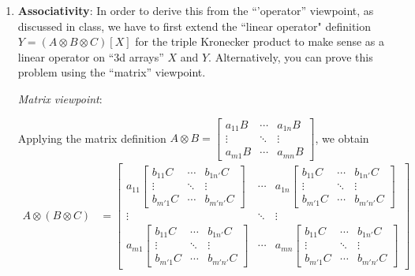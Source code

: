 \documentclass[10pt,oneside]{article}
\begin{document}
\begin{enumerate}

\item \textbf{Associativity}:  In order to derive this from the ``'operator'' viewpoint, as discussed in class, we have to first extend the ``linear operator" definition $Y = (A \otimes B \otimes C)[X]$ for the triple Kronecker product to make sense
as a linear operator on ``3d arrays'' $X$ and $Y$.   Alternatively, you can prove this problem using the ``matrix'' viewpoint.

\textit{Matrix viewpoint}:

Applying the matrix definition $A\otimes B = \begin{bmatrix}
  a_{11} B & \cdots & a_{1n}B \\
             \vdots & \ddots &           \vdots \\
  a_{m1} B & \cdots & a_{mn} B
\end{bmatrix}$, we obtain
\begin{align*}
A \otimes (B \otimes C) &= 
\begin{bmatrix}
  a_{11} \begin{bmatrix}
  b_{11} C & \cdots & b_{1n'}C \\
             \vdots & \ddots &           \vdots \\
  b_{m'1} C & \cdots & b_{m'n'} C
\end{bmatrix} & \cdots & a_{1n}\begin{bmatrix}
  b_{11} C & \cdots & b_{1n'}C \\
             \vdots & \ddots &           \vdots \\
  b_{m'1} C & \cdots & b_{m'n'} C
\end{bmatrix} \\
             \vdots & \ddots &           \vdots \\
  a_{m1} \begin{bmatrix}
  b_{11} C & \cdots & b_{1n'}C \\
             \vdots & \ddots &           \vdots \\
  b_{m'1} C & \cdots & b_{m'n'} C
\end{bmatrix} & \cdots & a_{mn} \begin{bmatrix}
  b_{11} C & \cdots & b_{1n'}C \\
             \vdots & \ddots &           \vdots \\
  b_{m'1} C & \cdots & b_{m'n'} C
\end{bmatrix}
\end{bmatrix} \\

\end{align*}
\end{enumerate}
\end{document}
